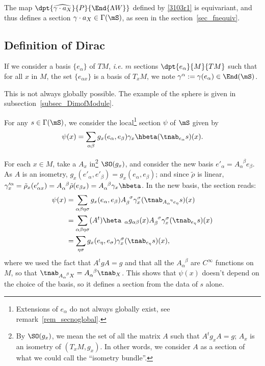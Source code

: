 The map $\dpt{\widehat{\gamma\cdot a_X}}{P}{\End{\Lambda W }}$ defined by \eqref{3103r1} is equivariant, and thus defines a section
$\gamma\cdot a_X\in\Gamma(\mS)$, as seen in the section~\ref{sec_fnequiv}.

\subsection{Definition of Dirac}

If we consider a basis $\{e_{\alpha}\}$ of $TM$, \emph{i.e.} $m$ sections $\dpt{e_{\alpha}}{M}{TM}$ such that for all $x$ in $M$, the set $\{e_{\alpha x}\}$ is a basis of $T_xM$, we note $\gamma^{\alpha}:=\gamma(e_{\alpha})\in\End(\mS)$.

\begin{remark}
	This is not always globally possible. The example of the sphere is given in subsection~\ref{subsec_DimofModule}.
	\label{rem_secnoglobal}
\end{remark}

For any $s\in\Gamma(\mS)$, we consider the local\footnote{Extensions of $e_{\alpha}$ do not always globally exist, see remark~\ref{rem_secnoglobal}.} section $\psi$ of $\mS$ given by
\[
	\psi(x)=
	\sum_{\alpha\beta}g_x(e_{\alpha},e_{\beta})\gamma_x\hbeta(\tnab_{e_{\alpha}}s)(x).
\]

For each $x\in M$, take a $A_x$ in\footnote{By $\SO(g_x)$, we mean the set of all the matrix $A$ such that $A^tg_xA=g$; $A_x$ is an isometry of $(T_xM,g_x)$. In other words, we consider $A$ as a section of what we could call the ``isometry bundle''.} $\SO(g_x)$, and consider the new basis $e'_{\alpha}=A_{\alpha}^{\phantom{\alpha}\beta}e_{\beta}$. As $A$ is an isometry, $g_x(e'_{\alpha},e'_{\beta})=g_x(e_{\alpha},e_{\beta})$; and since $\tilde\rho$ is linear, $\gamma_x'^{\alpha}=\tilde\rho_x(e'_{\alpha x})=A_{\alpha}^{\phantom{\alpha}\beta}\tilde\rho(e_{\beta x})=A_{\alpha}^{\phantom{\alpha}\beta}\gamma_x\hbeta$. In the new basis, the section reads:
\begin{equation}
	\begin{split}
		\psi(x)&=\sum_{\alpha\beta\eta\sigma}g_x(e_{\alpha},e_{\beta})
		A_{\beta}^{\phantom{\beta}\sigma}\gamma_x^{\sigma}
		(\tnab_{A_{\alpha}^{\phantom{\alpha}\eta}e_{\eta}}s)(x)\\
		&=\sum_{\alpha\beta\eta\sigma}(A^t)\heta_{\phantom{\eta}\alpha}
		g_{\alpha\beta}(x)A_{\beta}^{\phantom{\beta}\sigma}
		\gamma_x^{\sigma}(\tnab_{e_{\eta}}s)(x)\\
		&=\sum_{\eta\sigma}g_x(e_{\eta},e_{\sigma})\gamma_x^{\sigma}(\tnab_{e_{\eta}}s)(x),
	\end{split}
\end{equation}
where we used the fact that $A^tgA=g$ and that all the $A_{\alpha}^{\phantom{\alpha}\beta}$ are $C^{\infty}$ functions on $M$, so that
$\tnab_{A_{\alpha}^{\phantom{\alpha}\beta}X}=A_{\alpha}^{\phantom{\alpha}\beta}\tnab_X$.  This shows that $\psi(x)$ doesn't depend on the choice of the basis, so it defines a section from the data of $s$ alone.


